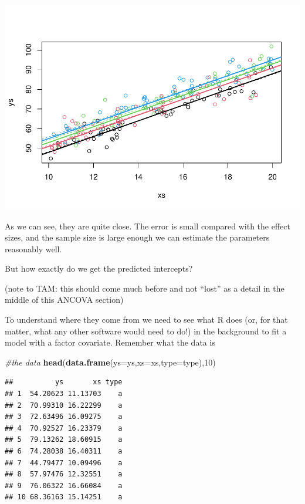 \documentclass[
]{book}
\newenvironment{Shaded}{\begin{snugshade}}{\end{snugshade}}
\newcommand{\CommentTok}[1]{\textcolor[rgb]{0.56,0.35,0.01}{\textit{#1}}}
\newcommand{\DataTypeTok}[1]{\textcolor[rgb]{0.13,0.29,0.53}{#1}}
\newcommand{\DecValTok}[1]{\textcolor[rgb]{0.00,0.00,0.81}{#1}}
\newcommand{\KeywordTok}[1]{\textcolor[rgb]{0.13,0.29,0.53}{\textbf{#1}}}
\newcommand{\NormalTok}[1]{#1}
\begin{document}
\includegraphics{ECOMODbook_files/figure-latex/a9.8-1.pdf}

As we can see, they are quite close. The error is small compared with the effect sizes, and the sample size is large enough we can estimate the parameters reasonably well.

But how exactly do we get the predicted intercepts?

(note to TAM: this should come much before and not ``lost'' as a detail in the middle of this ANCOVA section)

To understand where they come from we need to see what R does (or, for that matter, what any other software would need to do!) in the background to fit a model with a factor covariate. Remember what the data is

\begin{Shaded}
\begin{Highlighting}[]
\CommentTok{#the data}
\KeywordTok{head}\NormalTok{(}\KeywordTok{data.frame}\NormalTok{(}\DataTypeTok{ys=}\NormalTok{ys,}\DataTypeTok{xs=}\NormalTok{xs,}\DataTypeTok{type=}\NormalTok{type),}\DecValTok{10}\NormalTok{)}
\end{Highlighting}
\end{Shaded}

\begin{verbatim}
##          ys       xs type
## 1  54.20623 11.13703    a
## 2  70.99310 16.22299    a
## 3  72.63496 16.09275    a
## 4  70.92527 16.23379    a
## 5  79.13262 18.60915    a
## 6  74.28038 16.40311    a
## 7  44.79477 10.09496    a
## 8  57.97476 12.32551    a
## 9  76.06322 16.66084    a
## 10 68.36163 15.14251    a
\end{verbatim}
\end{document}
